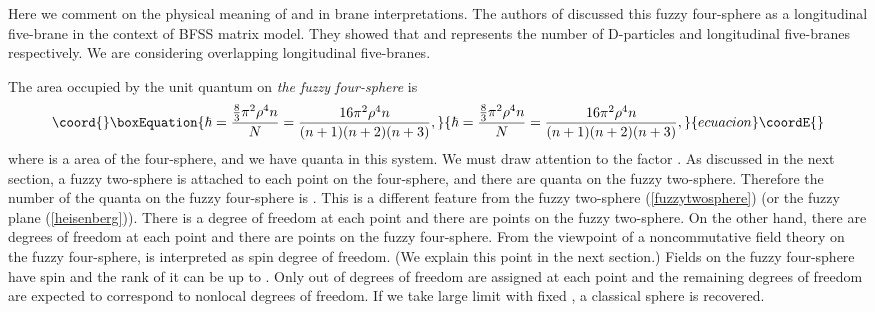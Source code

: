 \documentclass[a4paper,11pt]{article}
\begin{document}
Here we comment on the physical meaning of \coordHE{} and \coordHE{} 
in brane interpretations. 
The authors of \cite{castelino} 
discussed this fuzzy four-sphere as 
a longitudinal five-brane in the context of 
BFSS matrix model. 
They showed that 
\coordHE{} and \coordHE{} represents the number of D-particles and 
longitudinal five-branes respectively. 
We are considering \coordHE{} overlapping longitudinal five-branes.

The area occupied by the unit quantum 
on {\it the fuzzy four-sphere} is 
\begin{equation}\coord{}\boxEquation{
\hbar=\frac{\frac{8}{3}\pi^{2}\rho^{4} n}{N}
=\frac{16\pi^{2}\rho^{4}n}{(n+1)(n+2)(n+3)}, 
}{
\hbar=\frac{\frac{8}{3}\pi^{2}\rho^{4} n}{N}
=\frac{16\pi^{2}\rho^{4}n}{(n+1)(n+2)(n+3)}, 
}{ecuacion}\coordE{}\end{equation}
where \coordHE{} is a area of the four-sphere, and 
we have \coordHE{} quanta in this system. 
We must draw attention to the factor \coordHE{}. 
As discussed in the next section, a fuzzy two-sphere 
is attached to each point on the four-sphere\cite{horamgooram}, 
and there are \coordHE{} quanta on the fuzzy two-sphere. 
Therefore the number of the quanta on the fuzzy four-sphere 
is \coordHE{}. 
This is a different feature from 
the fuzzy two-sphere (\ref{fuzzytwosphere})
(or the fuzzy plane (\ref{heisenberg})). 
There is a degree of freedom 
at each point and there are 
\coordHE{} points  on the fuzzy two-sphere. On the other hand, 
there are \coordHE{}  
degrees of freedom at each point and 
there are \coordHE{} points on the 
fuzzy four-sphere. 
From the viewpoint of a noncommutative field theory 
on the fuzzy four-sphere, 
\coordHE{} is interpreted as spin degree of freedom. 
(We explain this point in the next section.) 
Fields on the fuzzy four-sphere 
have spin and the rank of it can be up to \coordHE{}. 
Only \coordHE{} out of \coordHE{} degrees of freedom are assigned at each 
point and the remaining \coordHE{} degrees of freedom 
are expected to correspond to nonlocal degrees of freedom. 
If we take large \coordHE{} limit with fixed \myHighlight{$\rho$}\coordHE{}, a classical 
sphere is recovered. 
\end{document}
